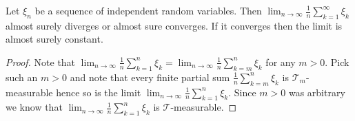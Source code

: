 \begin{cor}\label{AlmostSureAverages}Let $\xi_n$ be a sequence of independent random variables.
  Then $\lim_{n \to \infty} \frac{1}{n}\sum_{k=1}^\infty \xi_k$ almost
  surely diverges or almost sure converges.  If it converges then the
  limit is  almost surely constant.
\end{cor}
\begin{proof}
Note that $\lim_{n \to \infty} \frac{1}{n}\sum_{k=1}^n \xi_k =
\lim_{n \to \infty} \frac{1}{n}\sum_{k=m}^n \xi_k$ for any $m >
0$.  Pick such an $m > 0$ and note that every finite partial sum
$\frac{1}{n}\sum_{k=m}^n \xi_k$ is $\mathcal{T}_m$-measurable hence so
is the limit $\lim_{n\to \infty} \frac{1}{n}\sum_{k=1}^n \xi_k$.
Since $m >0$ was arbitrary we know that $\lim_{n\to \infty}
\frac{1}{n}\sum_{k=1}^n \xi_k$ is $\mathcal{T}$-measurable.  
\end{proof}

